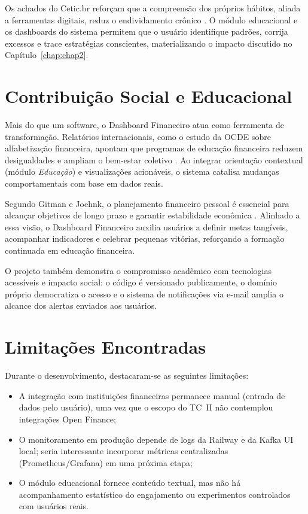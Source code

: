 Os achados do Cetic.br reforçam que a compreensão dos próprios hábitos, aliada a ferramentas digitais, reduz o endividamento crônico \cite{CETIC2023}. O módulo educacional e os dashboards do sistema permitem que o usuário identifique padrões, corrija excessos e trace estratégias conscientes, materializando o impacto discutido no Capítulo~\ref{chap:chap2}.

\section{Contribuição Social e Educacional}

Mais do que um software, o Dashboard Financeiro atua como ferramenta de transformação. Relatórios internacionais, como o estudo da OCDE sobre alfabetização financeira, apontam que programas de educação financeira reduzem desigualdades e ampliam o bem-estar coletivo \cite{OECD2023}. Ao integrar orientação contextual (módulo \textit{Educação}) e visualizações acionáveis, o sistema catalisa mudanças comportamentais com base em dados reais.

Segundo Gitman e Joehnk, o planejamento financeiro pessoal é essencial para alcançar objetivos de longo prazo e garantir estabilidade econômica \cite{GITMAN2018}. Alinhado a essa visão, o Dashboard Financeiro auxilia usuários a definir metas tangíveis, acompanhar indicadores e celebrar pequenas vitórias, reforçando a formação continuada em educação financeira.

O projeto também demonstra o compromisso acadêmico com tecnologias acessíveis e impacto social: o código é versionado publicamente, o domínio próprio democratiza o acesso e o sistema de notificações via e-mail amplia o alcance dos alertas enviados aos usuários.

\section{Limitações Encontradas}

Durante o desenvolvimento, destacaram-se as seguintes limitações:
\begin{itemize}
    \item A integração com instituições financeiras permanece manual (entrada de dados pelo usuário), uma vez que o escopo do TC~II não contemplou integrações Open Finance;
    \item O monitoramento em produção depende de logs da Railway e da Kafka UI local; seria interessante incorporar métricas centralizadas (Prometheus/Grafana) em uma próxima etapa;
    \item O módulo educacional fornece conteúdo textual, mas não há acompanhamento estatístico do engajamento ou experimentos controlados com usuários reais.
\end{itemize}

